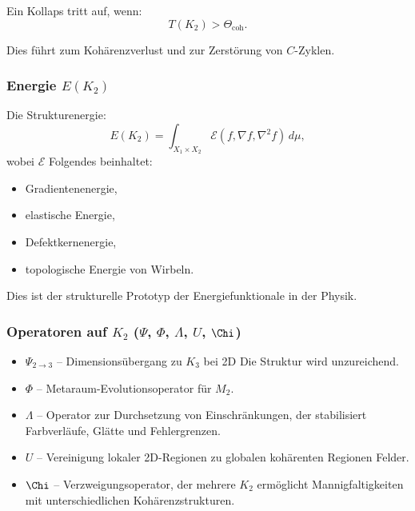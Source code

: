 Ein Kollaps tritt auf, wenn:
\[
T(K_2) > \Theta_{\mathrm{coh}}.
\]

Dies führt zum Kohärenzverlust und zur Zerstörung von $C$-Zyklen.

\subsubsection{Energie \texorpdfstring{$E(K_2)$}{E(K_2)}}

Die Strukturenergie:
\[
E(K_2) = \int_{X_1 \times X_2}
\mathcal{E}(f, \nabla f, \nabla^2 f)\, d\mu,
\]
wobei $\mathcal{E}$ Folgendes beinhaltet:
\begin{itemize}
    \item Gradientenenergie,
    \item elastische Energie,
    \item Defektkernenergie,
    \item topologische Energie von Wirbeln.
\end{itemize}

Dies ist der strukturelle Prototyp der Energiefunktionale in der Physik.

\subsubsection{Operatoren auf \texorpdfstring{$K_2$}{K_2} (\texorpdfstring{$\Psi$}{\Psi}, \texorpdfstring{$\Phi$}{\Phi}, \texorpdfstring{$\Lambda$}{\Lambda}, \texorpdfstring{$U$}{U}, \texorpdfstring{$\Chi$}{\Chi})}

\begin{itemize}
    \item $\Psi_{2\to3}$ – Dimensionsübergang zu $K_3$ bei 2D
          Die Struktur wird unzureichend.
    \item $\Phi$ – Metaraum-Evolutionsoperator für $M_2$.
    \item $\Lambda$ – Operator zur Durchsetzung von Einschränkungen, der stabilisiert
          Farbverläufe, Glätte und Fehlergrenzen.
    \item $U$ – Vereinigung lokaler 2D-Regionen zu globalen kohärenten Regionen
          Felder.
    \item $\Chi$ – Verzweigungsoperator, der mehrere $K_2$ ermöglicht
          Mannigfaltigkeiten mit unterschiedlichen Kohärenzstrukturen.
\end{itemize}

